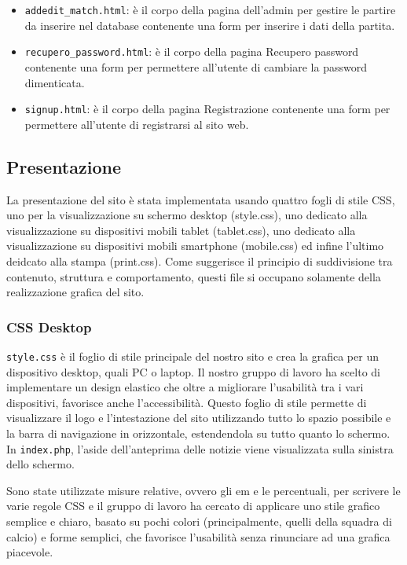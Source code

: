 \documentclass[12pt, a4paper]{article}
\begin{document}
\begin{itemize}
	\item \texttt{addedit\_match.html}: è il corpo della pagina dell'admin per gestire le partire da inserire nel database contenente una form per inserire i dati della partita.
	\item \texttt{recupero\_password.html}: è il corpo della pagina Recupero password contenente una form per permettere all'utente di cambiare la password dimenticata.
	\item \texttt{signup.html}: è il corpo della pagina Registrazione contenente una form per permettere all'utente di registrarsi al sito web.
\end{itemize}

\subsection{Presentazione}
La presentazione del sito è stata implementata usando quattro fogli di stile CSS, uno per la visualizzazione su schermo desktop (style.css), uno dedicato alla visualizzazione su dispositivi mobili tablet (tablet.css), uno dedicato alla visualizzazione su dispositivi mobili smartphone (mobile.css) ed infine
l'ultimo deidcato alla stampa (print.css). Come suggerisce il principio di suddivisione tra contenuto, struttura e comportamento, questi file si occupano solamente della realizzazione grafica del sito.

\subsubsection{CSS Desktop}
\texttt{style.css} è il foglio di stile principale del nostro sito e crea la grafica per un dispositivo desktop, quali PC o laptop. Il nostro gruppo di lavoro ha scelto di implementare un design elastico che oltre a migliorare l'usabilità tra i vari dispositivi, favorisce anche l'accessibilità. 
Questo foglio di stile permette di visualizzare il logo e l'intestazione del sito utilizzando tutto lo spazio possibile e la barra di navigazione in orizzontale, estendendola su tutto quanto lo schermo. In \texttt{index.php}, l'aside dell'anteprima delle notizie viene visualizzata sulla sinistra dello schermo.\par
Sono state utilizzate misure relative, ovvero gli em e le percentuali, per scrivere le varie regole CSS e il gruppo di lavoro ha cercato di applicare uno stile grafico semplice e chiaro, basato su pochi colori (principalmente, quelli della squadra di calcio) e forme semplici, che favorisce l'usabilità senza rinunciare ad una grafica piacevole.
\end{document}
